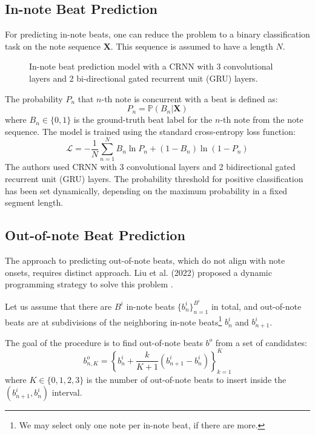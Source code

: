 \subsection{In-note Beat Prediction}

For predicting in-note beats, one can reduce the problem to a binary classification task on the note sequence $\mathbf{X}$. This sequence is assumed to have a length $N$.

\begin{figure}[!ht]
\centering

\caption[In-note beat prediction model]{In-note beat prediction model with a CRNN with 3 convolutional layers and 2 bi-directional gated recurrent unit (GRU) layers.}
\end{figure}

The probability $P_n$ that $n$-th note is concurrent with a beat is defined as: \[P_n = \mathbb{P}\left(B_n|\mathbf{X}\right)\] where $B_n\in\{0,1\}$ is the ground-truth beat label for the $n$-th note from the note sequence. The model is trained using the standard cross-entropy loss function: \[\mathcal{L}=-\frac{1}{N}\sum_{n=1}^N B_n\ln P_n + \left(1-B_n\right)\ln\left(1-P_n\right)\] The authors used CRNN with 3 convolutional layers and 2 bidirectional gated recurrent unit (GRU) layers. The probability threshold for positive classification has been set dynamically, depending on the maximum probability in a fixed segment length.

\subsection{Out-of-note Beat Prediction}

The approach to predicting out-of-note beats, which do not align with note onsets, requires distinct approach. Liu et al. (2022) proposed a dynamic programming strategy to solve this problem \cite{Liu2022}.

Let us assume that there are $B^i$ in-note beats $\{b_n^i\}_{n=1}^{B^i}$ in total, and out-of-note beats are at subdivisions of the neighboring in-note beats\footnote{We may select only one note per in-note beat, if there are more.} $b_{n}^i$ and $b_{n+1}^i$.

The goal of the procedure is to find out-of-note beats $b^o$ from a set of candidates: \begin{equation}\label{out_of_note_candidates}
b_{n,K}^o = \left\{b_n^i + \frac{k}{K+1}\left(b_{n+1}^i-b_n^i\right)\right\}_{k=1}^K
\end{equation} where $K\in\{0,1,2,3\}$ is the number of out-of-note beats to insert inside the $\left(b_{n+1}^i, b_n^i\right)$ interval.


